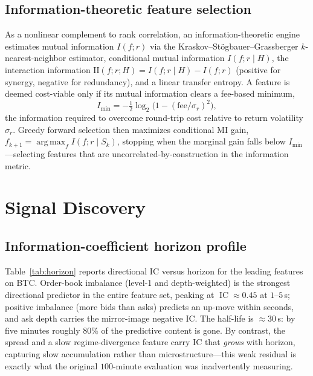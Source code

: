 \documentclass[11pt,a4paper]{article}
\theoremstyle{definition}
\theoremstyle{plain}
\DeclareMathOperator{\IC}{IC}
\DeclareMathOperator*{\argmax}{arg\,max}
\begin{document}
\subsection{Information-theoretic feature selection}

As a nonlinear complement to rank correlation, an information-theoretic engine estimates mutual
information $I(f;r)$ via the Kraskov--St\"ogbauer--Grassberger $k$-nearest-neighbor estimator,
conditional mutual information $I(f;r\mid H)$, the interaction information
$\mathrm{II}(f;r;H)=I(f;r\mid H)-I(f;r)$ (positive for synergy, negative for redundancy), and a
linear transfer entropy. A feature is deemed cost-viable only if its mutual information clears a
fee-based minimum,
\begin{equation}
  I_{\min} = -\tfrac{1}{2}\log_2\!\Big(1 - (\text{fee}/\sigma_r)^2\Big),
  \label{eq:imin}
\end{equation}
the information required to overcome round-trip cost relative to return volatility $\sigma_r$.
Greedy forward selection then maximizes conditional MI gain, $f_{k+1}=\argmax_f I(f;r\mid S_k)$,
stopping when the marginal gain falls below $I_{\min}$---selecting features that are
uncorrelated-by-construction in the information metric.

\section{Signal Discovery}
\label{sec:discovery}

\subsection{Information-coefficient horizon profile}

Table~\ref{tab:horizon} reports directional IC versus horizon for the leading features on BTC.
Order-book imbalance (level-1 and depth-weighted) is the strongest directional predictor in the
entire feature set, peaking at $\IC\approx 0.45$ at $1$--$5$\,s; positive imbalance (more bids than
asks) predicts an up-move within seconds, and ask depth carries the mirror-image negative IC. The
half-life is $\approx 30$\,s: by five minutes roughly $80\%$ of the predictive content is gone. By
contrast, the spread and a slow regime-divergence feature carry IC that \emph{grows} with horizon,
capturing slow accumulation rather than microstructure---this weak residual is exactly what the
original $100$-minute evaluation was inadvertently measuring.
\end{document}
